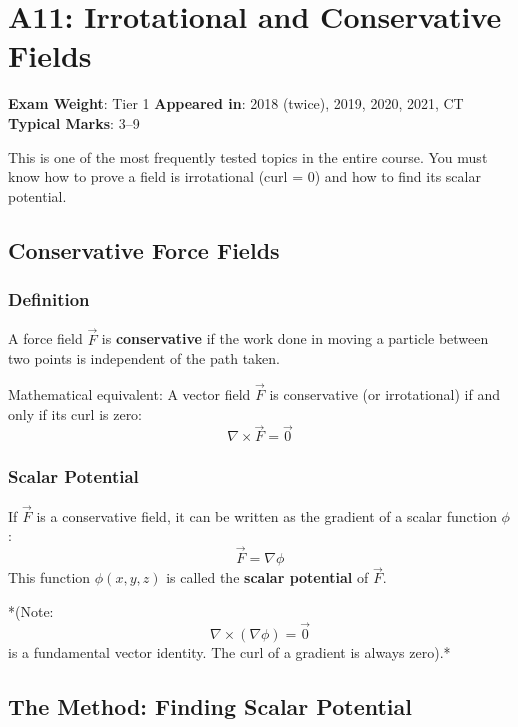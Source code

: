 \documentclass[
]{article}
\renewenvironment{quote}
  {\begin{tcolorbox}[
     colback=calloutbg,
     colframe=calloutframe,
     colupper=callouttext,
     arc=3pt,
     boxrule=0.5pt,
     leftrule=0.5pt,
     borderline west={3pt}{0pt}{calloutaccent},
     left=8pt,
     right=8pt,
     top=6pt,
     bottom=6pt
   ]}
  {\end{tcolorbox}}
\begin{document}
\section{A11: Irrotational and Conservative
Fields}\label{a11-irrotational-and-conservative-fields}

\begin{quote}
\textbf{Exam Weight}: Tier 1 \textbar{} \textbf{Appeared in}: 2018
(twice), 2019, 2020, 2021, CT \textbar{} \textbf{Typical Marks}: 3--9
\end{quote}

This is one of the most frequently tested topics in the entire course.
You must know how to prove a field is irrotational (curl = 0) and how to
find its scalar potential.

\subsection{Conservative Force Fields}\label{conservative-force-fields}

\subsubsection{Definition}\label{definition-4}

A force field \(\vec{F}\) is \textbf{conservative} if the work done in
moving a particle between two points is independent of the path taken.

Mathematical equivalent: A vector field \(\vec{F}\) is conservative (or
irrotational) if and only if its curl is zero:
\[
\nabla \times \vec{F} = \vec{0}
\]
\subsubsection{Scalar Potential}\label{scalar-potential}

If \(\vec{F}\) is a conservative field, it can be written as the
gradient of a scalar function \(\phi\):
\[
\vec{F} = \nabla\phi
\]
This function \(\phi(x, y, z)\) is called the \textbf{scalar potential}
of \(\vec{F}\).

*(Note:
\[
\nabla \times (\nabla\phi) = \vec{0}
\]
is a fundamental vector identity. The curl of a gradient is always
zero).*

\subsection{The Method: Finding Scalar
Potential}\label{the-method-finding-scalar-potential}
\end{document}
